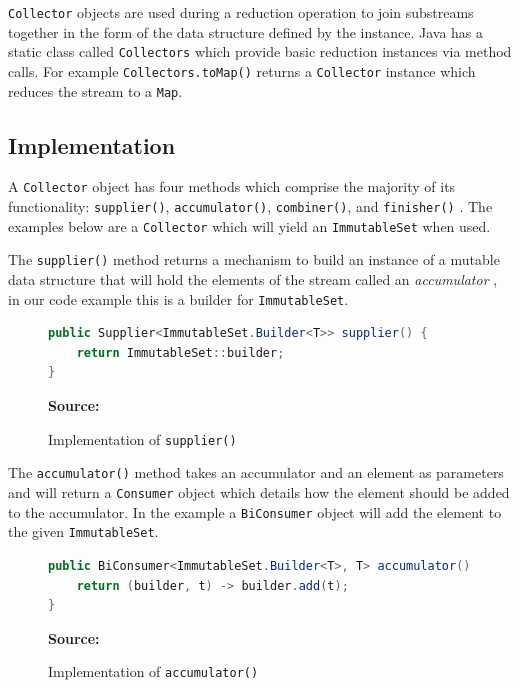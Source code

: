 \documentclass[oneside, 12pt]{article}
\newcommand{\source}[1]{\textbf{Source:} {#1} }
\begin{document}
\verb|Collector| objects are used during a reduction operation to join substreams together in the form of the data structure defined by the instance. Java has a static class called \verb|Collectors| which provide basic reduction instances via method calls. For example \verb|Collectors.toMap()| returns a \verb|Collector| instance which reduces the stream to a \verb|Map|. 

\subsection{Implementation}

A \verb|Collector| object has four methods which comprise the majority of its functionality: \verb|supplier()|, \verb|accumulator()|, \verb|combiner()|, and \verb|finisher()| \autocite{collector_doc}. The examples below are a \verb|Collector| which will yield an \verb|ImmutableSet| when used.

The \verb|supplier()| method returns a mechanism to build an instance of a mutable data structure that will hold the elements of the stream called an \textit{accumulator} \autocite{custom_collector}, in our code example this is a builder for \verb|ImmutableSet|.

\begin{figure}[H]
\centering
\begin{lstlisting}[language=Java]
public Supplier<ImmutableSet.Builder<T>> supplier() {
    return ImmutableSet::builder;
}
\end{lstlisting}
\caption{Implementation of {\tt supplier()}}
\source{\autocite{custom_collector}}
\label{fig:supplier}
\end{figure}

The \verb|accumulator()| method takes an accumulator and an element as parameters and will return a \verb|Consumer| object which details how the element should be added to the accumulator. In the example a \verb|BiConsumer| object will add the element to the given \verb|ImmutableSet|.

\begin{figure}[H]
\centering
\begin{lstlisting}[language=Java]
public BiConsumer<ImmutableSet.Builder<T>, T> accumulator() {
    return (builder, t) -> builder.add(t);
}
\end{lstlisting}
\caption{Implementation of {\tt accumulator()}}
\source{\autocite{custom_collector}}
\label{fig:accumulator}
\end{figure}
\end{document}
